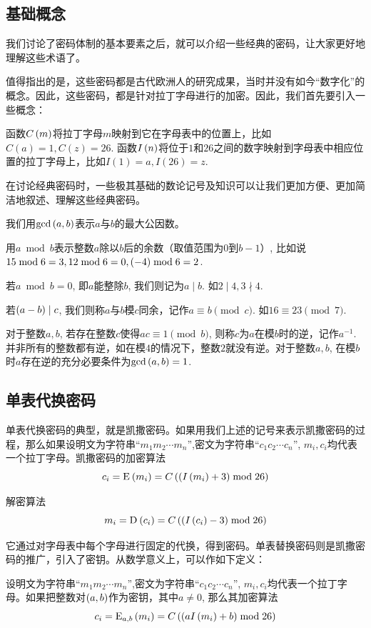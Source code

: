 \subsection{基础概念}
我们讨论了密码体制的基本要素之后，就可以介绍一些经典的密码，让大家更好地理解这些术语了。\par
值得指出的是，这些密码都是古代欧洲人的研究成果，当时并没有如今“数字化”的概念。因此，这些密码，都是针对拉丁字母进行的加密。因此，我们首先要引入一些概念：\par
函数$C\left( {m}\right)$将拉丁字母$m$映射到它在字母表中的位置上，比如$C(a)=1, C(z)=26$. 函数$I\left( {n}\right)$将位于$1$和$26$之间的数字映射到字母表中相应位置的拉丁字母上，比如$I(1)=a, I(26)=z$.\par
在讨论经典密码时，一些极其基础的数论记号及知识可以让我们更加方便、更加简洁地叙述、理解这些经典密码。\par
我们用$\gcd\left( {a, b}\right)$表示$a$与$b$的最大公因数。\par
用$a\bmod{b}$表示整数$a$除以$b$后的余数（取值范围为$0$到$b-1$）, 比如说$15\bmod{6}=3, 12\bmod{6}=0, \left( {-4}\right)\bmod{6}=2$.\par
若$a\bmod{b}=0$, 即$a$能整除$b$, 我们则记为$a\mid b$. 如$2\mid 4, 3\nmid 4$.\par
若$\left( {a-b}\right)\mid c$, 我们则称$a$与$b$模$c$同余，记作$a\equiv b\pmod{c}$. 如$16\equiv 23\pmod{7}$.\par
对于整数$a, b$, 若存在整数$c$使得$ac\equiv 1\pmod{b}$, 则称$c$为$a$在模$b$时的逆，记作$a^{-1}$. 并非所有的整数都有逆，如在模$4$的情况下，整数$2$就没有逆。对于整数$a, b$, 在模$b$时$a$存在逆的充分必要条件为$\gcd\left( {a, b}\right)=1$.
\subsection{单表代换密码}
单表代换密码的典型，就是凯撒密码。如果用我们上述的记号来表示凯撒密码的过程，那么如果设明文为字符串``$m_1m_2\cdots m_n$'',密文为字符串``$c_1c_2\cdots c_n$'', $m_i, c_i$均代表一个拉丁字母。凯撒密码的加密算法
\begin{equation}
    c_i={\mathrm{E}_{}\left({m_i}\right)}=C\left( {\left( {I\left( {m_i}\right)+3}\right)\bmod{26}}\right)
\end{equation}

解密算法
\begin{equation}
    m_i={\mathrm{D}_{}\left({c_i}\right)}=C\left( {\left( {I\left( {c_i}\right)-3}\right)\bmod{26}}\right)
\end{equation}

它通过对字母表中每个字母进行固定的代换，得到密码。单表替换密码则是凯撒密码的推广，引入了密钥。从数学意义上，可以作如下定义：\par
设明文为字符串``$m_1m_2\cdots m_n$'',密文为字符串``$c_1c_2\cdots c_n$'', $m_i, c_i$均代表一个拉丁字母。如果把整数对$\left( {a, b}\right)$作为密钥，其中$a\neq 0$, 那么其加密算法
\[c_i={\mathrm{E}_{a, b}\left({m_i}\right)}=C\left( {\left( {aI\left( {m_i}\right)+b}\right)\bmod{26}}\right)\]

